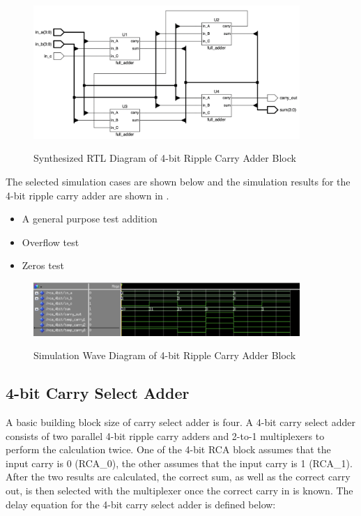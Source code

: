 \begin{figure}[!htp]
	\centering
	\caption{Synthesized RTL Diagram of 4-bit Ripple Carry Adder Block}
	\includegraphics[width=0.9\textwidth]{../img/rca_rtl.png}
	\label{fig:rca_rtl}
\end{figure}

\noindent The selected simulation cases are shown below and the simulation results for the 4-bit ripple carry adder are shown in .
\begin{itemize}
	\item A general purpose test addition
	\item Overflow test
	\item Zeros test
\end{itemize}

\begin{figure}[!htp]
	\centering
	\caption{Simulation Wave Diagram of 4-bit Ripple Carry Adder Block}
	\includegraphics[width=0.9\textwidth]{../img/rca_sim.png}
	\label{fig:rca_sim}
\end{figure}

\subsection{4-bit Carry Select Adder}

A basic building block size of carry select adder is four.
A 4-bit carry select adder consists of two parallel 4-bit ripple carry adders and 2-to-1 multiplexers to perform the calculation twice.
One of the 4-bit RCA block assumes that the input carry is 0 (RCA\_0), the other assumes that the input carry is 1 (RCA\_1).
After the two results are calculated, the correct sum, as well as the correct carry out, is then selected with the multiplexer once the correct carry in is known.
The delay equation for the 4-bit carry select adder is defined below:

